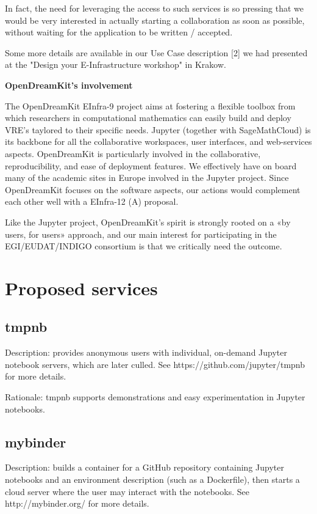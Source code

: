 In fact, the need for leveraging the access to such services is so
pressing that we would be very interested in actually starting a
collaboration as soon as possible, without waiting for the application
to be written / accepted.

Some more details are available in our Use Case description [2] we had
presented at the "Design your E-Infrastructure workshop" in Krakow.

\textbf{OpenDreamKit's involvement}

The OpenDreamKit EInfra-9 project aims at fostering a flexible toolbox
from which researchers in computational mathematics can easily build
and deploy VRE's taylored to their specific needs. Jupyter (together
with SageMathCloud) is its backbone for all the collaborative
workspaces, user interfaces, and web-services aspects. OpenDreamKit is
particularly involved in the collaborative, reproducibility, and ease
of deployment features. We effectively have on board many of the
academic sites in Europe involved in the Jupyter project. Since
OpenDreamKit focuses on the software aspects, our actions would
complement each other well with a EInfra-12 (A) proposal.

Like the Jupyter project, OpenDreamKit's spirit is strongly rooted on
a «by users, for users» approach, and our main interest for
participating in the EGI/EUDAT/INDIGO consortium is that we critically
need the outcome.

\section{Proposed services}

\subsection{tmpnb}

Description: provides anonymous users with individual, on-demand Jupyter
notebook servers, which are later culled. See https://github.com/jupyter/tmpnb
for more details.

Rationale: tmpnb supports demonstrations and easy experimentation in
Jupyter notebooks.


\subsection{mybinder}

Description: builds a container for a GitHub repository containing
Jupyter notebooks and an environment description (such as a
Dockerfile), then starts a cloud server where the user may interact
with the notebooks. See http://mybinder.org/ for more details.

